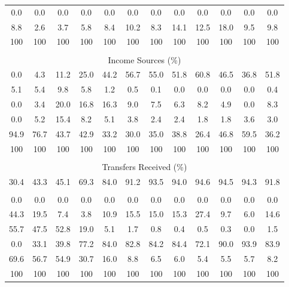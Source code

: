 \begin{tabular}{c c c| c c c c c| c c c| c}
0.0 & 0.0 & 0.0 & 0.0 & 0.0 & 0.0 & 0.0 & 0.0 & 0.0 & 0.0 & 0.0 & 0.0 \\
8.8 & 2.6 & 3.7 & 5.8 & 8.4 & 10.2 & 8.3 & 14.1 & 12.5 & 18.0 & 9.5 & 9.8 \\
\midrule
100 & 100 & 100 & 100 & 100 & 100 & 100 & 100 & 100 & 100 & 100 & 100 \\
\midrule \\
\multicolumn{12}{c}{Income Sources (\%)}  \\
\midrule
0.0 & 4.3 & 11.2 & 25.0 & 44.2 & 56.7 & 55.0 & 51.8 & 60.8 & 46.5 & 36.8 & 51.8 \\
5.1 & 5.4 & 9.8 & 5.8 & 1.2 & 0.5 & 0.1 & 0.0 & 0.0 & 0.0 & 0.0 & 0.4 \\
0.0 & 3.4 & 20.0 & 16.8 & 16.3 & 9.0 & 7.5 & 6.3 & 8.2 & 4.9 & 0.0 & 8.3 \\
0.0 & 5.2 & 15.4 & 8.2 & 5.1 & 3.8 & 2.4 & 2.4 & 1.8 & 1.8 & 3.6 & 3.0 \\
94.9 & 76.7 & 43.7 & 42.9 & 33.2 & 30.0 & 35.0 & 38.8 & 26.4 & 46.8 & 59.5 & 36.2 \\
\midrule
100 & 100 & 100 & 100 & 100 & 100 & 100 & 100 & 100 & 100 & 100 & 100 \\
\midrule \\
\multicolumn{12}{c}{Transfers Received (\%)}  \\
\midrule
30.4 & 43.3 & 45.1 & 69.3 & 84.0 & 91.2 & 93.5 & 94.0 & 94.6 & 94.5 & 94.3 & 91.8 \\
 & & & & & & & & & & &  \\
0.0 & 0.0 & 0.0 & 0.0 & 0.0 & 0.0 & 0.0 & 0.0 & 0.0 & 0.0 & 0.0 & 0.0 \\
44.3 & 19.5 & 7.4 & 3.8 & 10.9 & 15.5 & 15.0 & 15.3 & 27.4 & 9.7 & 6.0 & 14.6 \\
55.7 & 47.5 & 52.8 & 19.0 & 5.1 & 1.7 & 0.8 & 0.4 & 0.5 & 0.3 & 0.0 & 1.5 \\
0.0 & 33.1 & 39.8 & 77.2 & 84.0 & 82.8 & 84.2 & 84.4 & 72.1 & 90.0 & 93.9 & 83.9 \\
69.6 & 56.7 & 54.9 & 30.7 & 16.0 & 8.8 & 6.5 & 6.0 & 5.4 & 5.5 & 5.7 & 8.2 \\
\midrule
100 & 100 & 100 & 100 & 100 & 100 & 100 & 100 & 100 & 100 & 100 & 100 \\
\bottomrule
\end{tabular}